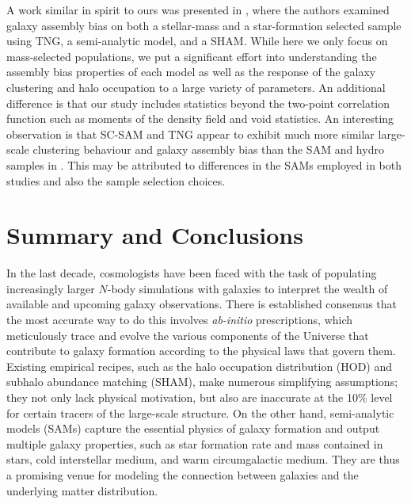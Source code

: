 \documentclass[fleqn,usenatbib]{mnras}
\newcommand{\rss}[1]{\textcolor{purple}{(rss: #1)}}
\begin{document}
A work similar in spirit to ours was presented in \citet{2021MNRAS.504.5205C}, where the authors examined galaxy assembly bias on both a stellar-mass and a star-formation selected sample using TNG, a semi-analytic model, and a SHAM. While here we only focus on mass-selected populations, we put a significant effort into understanding the assembly bias properties of each model as well as the response of the galaxy clustering and halo occupation to a large variety of parameters. An additional difference is that our study includes statistics beyond the two-point correlation function such as moments of the density field and void statistics. An interesting observation is that SC-SAM and TNG appear to exhibit much more similar large-scale clustering behaviour and galaxy assembly bias than the SAM and hydro samples in \citet{2021MNRAS.504.5205C}. This may be attributed to differences in the SAMs employed in both studies and also the sample selection choices.


\section{Summary and Conclusions}
\label{sec:conc}
In the last decade, cosmologists have been faced with the task of populating increasingly larger $N$-body simulations with galaxies to interpret the wealth of available and upcoming galaxy observations. There is established consensus that the most accurate way to do this involves \textit{ab-initio} prescriptions, which meticulously trace and evolve the various components of the Universe that contribute to galaxy formation according to the physical laws that govern them. Existing empirical recipes, such as the halo occupation distribution (HOD) and subhalo abundance matching (SHAM), make numerous simplifying assumptions; they not only lack physical motivation, but also are inaccurate at the 10\% level for certain tracers of the large-scale structure. On the other hand, semi-analytic models (SAMs) capture the essential physics of galaxy formation and output multiple galaxy properties, such as star formation rate and mass contained in stars, cold interstellar medium, and warm circumgalactic medium. They are thus a promising venue for modeling the connection between galaxies and the underlying matter distribution.
\end{document}

